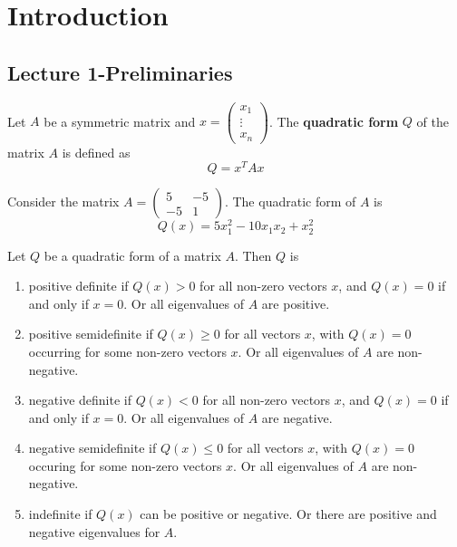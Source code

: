 
% 
\section{Introduction}
\subsection{Lecture 1-Preliminaries}
\begin{definition}
    Let $A$ be a symmetric matrix and $x = \begin{pmatrix}
        x_1 \\ \vdots \\ x_n
    \end{pmatrix}$. The \textbf{quadratic form} $Q$ of the matrix $A$ is defined as $$Q = x^T Ax$$
\end{definition}

\begin{Example}
    Consider the matrix $A = \begin{pmatrix}
        5 & -5 \\
        -5 & 1
    \end{pmatrix}$. The quadratic form of $A$ is $$Q(x) = 5x^2_1 - 10x_1x_2 + x^2_2$$
\end{Example}
\begin{definition}
    Let $Q$ be a quadratic form of a matrix $A$. Then $Q$ is
    \begin{enumerate}
        \item positive definite if $Q(x) > 0$ for all non-zero vectors $x$, and $Q(x) = 0$ if and only if $x = 0$. Or all eigenvalues of $A$ are positive.
        \item positive semidefinite if $Q(x) \geq 0$ for all vectors $x$, with $Q(x) = 0$ occurring for some non-zero vectors $x$. Or all eigenvalues of $A$ are non-negative.
        \item negative definite if $Q(x) < 0$ for all non-zero vectors $x$, and $Q(x) = 0$ if and only if $x = 0$. Or all eigenvalues of $A$ are negative.
        \item negative semidefinite if $Q(x) \leq 0$ for all vectors $x$, with $Q(x) = 0$ occuring for some non-zero vectors $x$. Or all eigenvalues of $A$ are non-negative.
        \item indefinite if $Q(x)$ can be positive or negative. Or there are positive and negative eigenvalues for $A$.
    \end{enumerate}
\end{definition}

